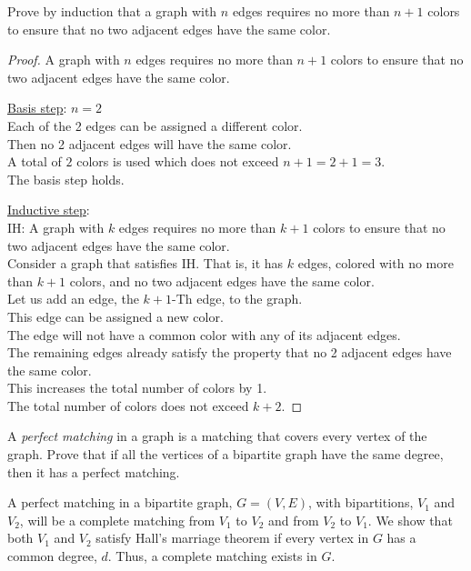 \documentclass[a4paper]{exam}
\begin{document}
\begin{questions}
  \question Prove by induction that a graph with $n$ edges requires no more than $n+1$ colors to ensure that no two adjacent edges have the same color.
  \begin{solution}
    \begin{proof} A graph with $n$ edges requires no more than $n+1$ colors to ensure that no two adjacent edges have the same color.

      \underline{Basis step}: $n=2$\\
      Each of the 2 edges can be assigned a different color.\\
      Then no 2 adjacent edges will have the same color.\\
      A total of $2$ colors is used which does not exceed $n+1=2+1=3$.\\
      The basis step holds.

      \underline{Inductive step}: \\
      IH: A graph with $k$ edges requires no more than $k+1$ colors to ensure that no two adjacent edges have the same color.\\
      Consider a graph that satisfies IH. That is, it has $k$ edges, colored with no more than $k+1$ colors, and no two adjacent edges have the same color.\\
      Let us add an edge, the $k+1$-Th edge, to the graph.\\
      This edge can be assigned a new color.\\
      The edge will not have a common color with any of its adjacent edges.\\
      The remaining edges already satisfy the property that no 2 adjacent edges have the same color.\\
      This increases the total number of colors by 1.\\
      The total number of colors does not exceed $k+2$.
    \end{proof}
  \end{solution}
  
  \question A \textit{perfect matching} in a graph is a matching that covers every vertex of the graph. Prove that if all the vertices of a bipartite graph have the same degree, then it has a perfect matching.
  \begin{solution}
    A perfect matching in a bipartite graph, $G=(V,E)$, with bipartitions, $V_1$ and $V_2$, will be a complete matching from $V_1$ to $V_2$ and from $V_2$ to $V_1$. We show that both $V_1$ and $V_2$ satisfy Hall's marriage theorem if every vertex in $G$ has a common degree, $d$. Thus, a complete matching exists in $G$.


\end{solution}
\end{questions}
\end{document}
